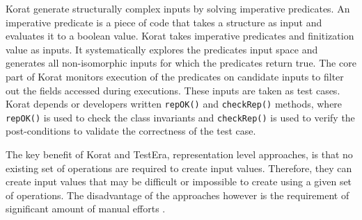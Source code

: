 Korat generate structurally complex inputs by solving imperative predicates. An imperative predicate is a piece of code that takes a structure as input and evaluates it to a boolean value. Korat takes imperative predicates and finitization value as inputs. It systematically explores the predicates input space and generates all non-isomorphic inputs for which the predicates return true. The core part of Korat monitors execution of the predicates on candidate inputs to filter out the fields accessed during executions. These inputs are taken as test cases. Korat depends or developers written \verb+repOK()+ and \verb+checkRep()+ methods, where \verb+repOK()+ is used to check the class invariants and \verb+checkRep()+ is used to verify the post-conditions to validate the correctness of the test case. 

The key benefit of Korat and TestEra, representation level approaches, is that no existing set of operations are required to create input values. Therefore, they can create input values that may be difficult or impossible to create using a given set of operations. The disadvantage of the approaches however is the requirement of significant amount of manual efforts \cite{pacheco2009directed}.    














